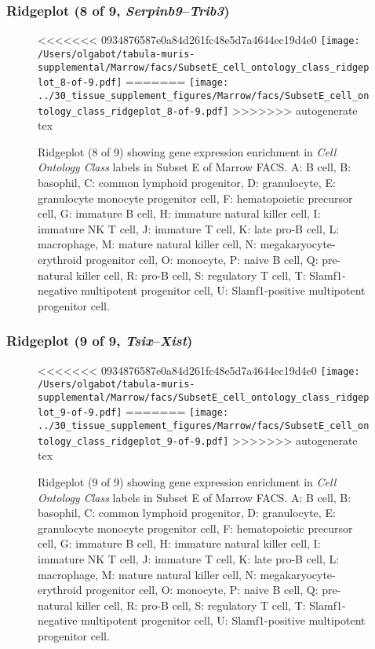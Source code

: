 \clearpage

\subsubsection{Ridgeplot (8 of 9, \emph{Serpinb9}--\emph{Trib3})}
\begin{figure}[h]
\centering
<<<<<<< 0934876587e0a84d261fc48e5d7a4644ec19d4e0
\texttt{[image: /Users/olgabot/tabula-muris-supplemental/Marrow/facs/SubsetE\_cell\_ontology\_class\_ridgeplot\_8-of-9.pdf]}
=======
\texttt{[image: ../30\_tissue\_supplement\_figures/Marrow/facs/SubsetE\_cell\_ontology\_class\_ridgeplot\_8-of-9.pdf]}
>>>>>>> autogenerate tex

\caption{ Ridgeplot (8 of 9)  showing gene expression enrichment in \emph{Cell Ontology Class} labels in Subset E of Marrow FACS. A: B cell, B: basophil, C: common lymphoid progenitor, D: granulocyte, E: granulocyte monocyte progenitor cell, F: hematopoietic precursor cell, G: immature B cell, H: immature natural killer cell, I: immature NK T cell, J: immature T cell, K: late pro-B cell, L: macrophage, M: mature natural killer cell, N: megakaryocyte-erythroid progenitor cell, O: monocyte, P: naive B cell, Q: pre-natural killer cell, R: pro-B cell, S: regulatory T cell, T: Slamf1-negative multipotent progenitor cell, U: Slamf1-positive multipotent progenitor cell.}
\end{figure}


\clearpage

\subsubsection{Ridgeplot (9 of 9, \emph{Tsix}--\emph{Xist})}
\begin{figure}[h]
\centering
<<<<<<< 0934876587e0a84d261fc48e5d7a4644ec19d4e0
\texttt{[image: /Users/olgabot/tabula-muris-supplemental/Marrow/facs/SubsetE\_cell\_ontology\_class\_ridgeplot\_9-of-9.pdf]}
=======
\texttt{[image: ../30\_tissue\_supplement\_figures/Marrow/facs/SubsetE\_cell\_ontology\_class\_ridgeplot\_9-of-9.pdf]}
>>>>>>> autogenerate tex

\caption{ Ridgeplot (9 of 9)  showing gene expression enrichment in \emph{Cell Ontology Class} labels in Subset E of Marrow FACS. A: B cell, B: basophil, C: common lymphoid progenitor, D: granulocyte, E: granulocyte monocyte progenitor cell, F: hematopoietic precursor cell, G: immature B cell, H: immature natural killer cell, I: immature NK T cell, J: immature T cell, K: late pro-B cell, L: macrophage, M: mature natural killer cell, N: megakaryocyte-erythroid progenitor cell, O: monocyte, P: naive B cell, Q: pre-natural killer cell, R: pro-B cell, S: regulatory T cell, T: Slamf1-negative multipotent progenitor cell, U: Slamf1-positive multipotent progenitor cell.}
\end{figure}


